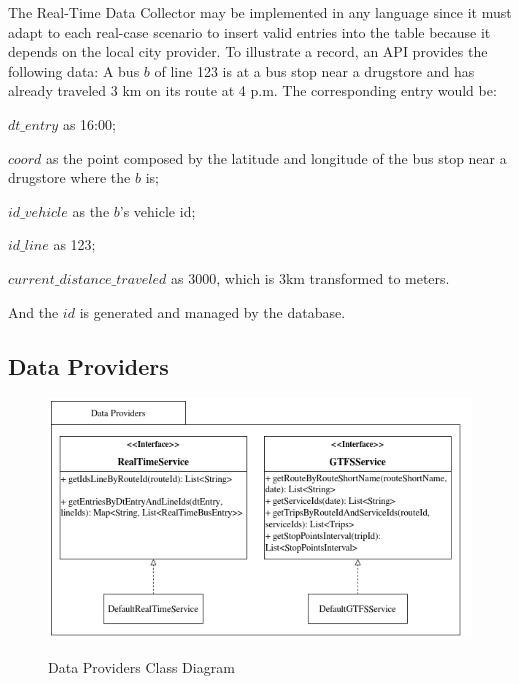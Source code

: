 The Real-Time Data Collector may be implemented in any language since
it must adapt to each real-case scenario to insert valid entries into the table
because it depends on the local city provider.
To illustrate a record, an API provides the following data:
A bus $b$ of line 123 is at a bus stop
near a drugstore and has already traveled 3 km on its route at 4 p.m.
The corresponding entry would be:
\begin{enumerate*}
  \item $dt\_entry$ as 16:00;
  \item $coord$ as the point composed by the latitude and longitude of the 
  bus stop near a drugstore where the $b$ is;
  \item $id\_vehicle$ as the $b$'s vehicle id;
  \item $id\_line$ as 123;
  \item $current\_distance\_traveled$ as 3000, which is 3km transformed to meters.
\end{enumerate*}
And the $id$ is generated and managed by the database.


\label{sub:dataProviders}
\subsection{Data Providers}

\begin{figure}[h]
     \centering
        \caption{Data Providers Class Diagram}
         \includegraphics[width=.9 \textwidth]{imagem/cap4/dataProviderED.drawio.png}
        \label{cdProviders}
\end{figure}

